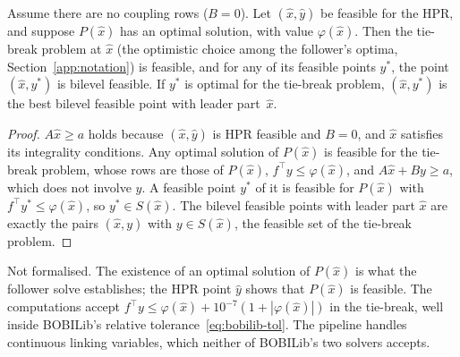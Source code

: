 \begin{proposition}\label{prop:general-pipeline}
Assume there are no coupling rows ($B=0$). Let $(\hat x,\hat y)$ be feasible for
the HPR, and suppose $P(\hat x)$ has an optimal solution, with value
$\varphi(\hat x)$. Then the tie-break problem at $\hat x$ (the optimistic choice
among the follower's optima, Section~\ref{app:notation}) is feasible, and for
any of its feasible points $y^{*}$, the point $(\hat x,y^{*})$ is bilevel
feasible. If $y^{*}$ is optimal for the tie-break problem, $(\hat x,y^{*})$ is the
best bilevel feasible point with leader part~$\hat x$.
\end{proposition}
\begin{proof}
$A\hat x\ge a$ holds because $(\hat x,\hat y)$ is HPR feasible and $B=0$, and
$\hat x$ satisfies its integrality conditions. Any optimal solution of
$P(\hat x)$ is feasible for the tie-break problem, whose rows are those of
$P(\hat x)$, $f^{\top}y\le\varphi(\hat x)$, and $A\hat x+By\ge a$, which does not involve
$y$. A feasible point $y^{*}$ of it is feasible for $P(\hat x)$ with
$f^{\top}y^{*}\le\varphi(\hat x)$, so $y^{*}\in S(\hat x)$. The bilevel feasible points
with leader part $\hat x$ are exactly the pairs $(\hat x,y)$ with $y\in S(\hat x)$, the
feasible set of the tie-break problem.
\end{proof}
\noindent Not formalised. The existence of an optimal solution of $P(\hat x)$
is what the follower solve establishes; the HPR point $\hat y$ shows that
$P(\hat x)$ is feasible. The computations accept $f^{\top}y\le\varphi(\hat x)+10^{-7}(1+|\varphi(\hat x)|)$
in the tie-break, well inside BOBILib's relative tolerance~\eqref{eq:bobilib-tol}.
The pipeline handles continuous linking variables, which neither of
BOBILib's two solvers accepts.

